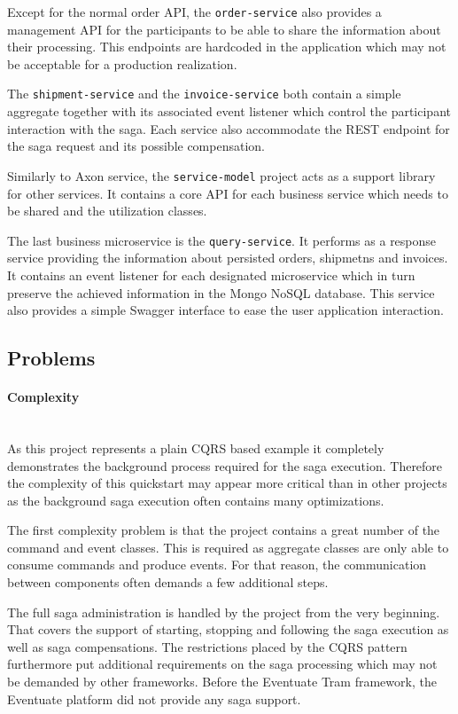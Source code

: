 \documentclass[oneside,
  digital, %
  table,   %
  nolof,     %
  nolot,     %
]{fithesis3}
\newcommand{\newlinepar}[1]{\paragraph{#1}\needspace{4\baselineskip}\mbox{}\\}
\begin{document}
Except for the normal order API, the \texttt{order-service} also provides a management API for the participants to be able to share the information about their processing. This endpoints are hardcoded in the application which may not be acceptable for a production realization.

The \texttt{shipment-service} and the \texttt{invoice-service} both contain a simple aggregate together with its associated event listener which control the participant interaction with the saga. Each service also accommodate the REST endpoint for the saga request and its possible compensation.

Similarly to Axon service, the \texttt{service-model} project acts as a support library for other services. It contains a core API for each business service which needs to be shared and the utilization classes.

The last business microservice is the \texttt{query-service}. It performs as a response service providing the information about persisted orders, shipmetns and invoices. It contains an event listener for each designated microservice which in turn preserve the achieved information in the Mongo NoSQL database. This service also provides a simple Swagger interface to ease the user application interaction.

\subsection{Problems}

\newlinepar{Complexity}

As this project represents a plain CQRS based example it completely demonstrates the background process required for the saga execution. Therefore the complexity of this quickstart may appear more critical than in other projects as the background saga execution often contains many optimizations.

The first complexity problem is that the project contains a great number of the command and event classes. This is required as aggregate classes are only able to consume commands and produce events. For that reason,  the communication between components often demands a few additional steps.

The full saga administration is handled by the project from the very beginning. That covers the support of starting, stopping and following the saga execution as well as saga compensations. The restrictions placed by the CQRS pattern furthermore put additional requirements on the saga processing which may not be demanded by other frameworks. Before the Eventuate Tram framework, the Eventuate platform did not provide any saga support.
\end{document}

